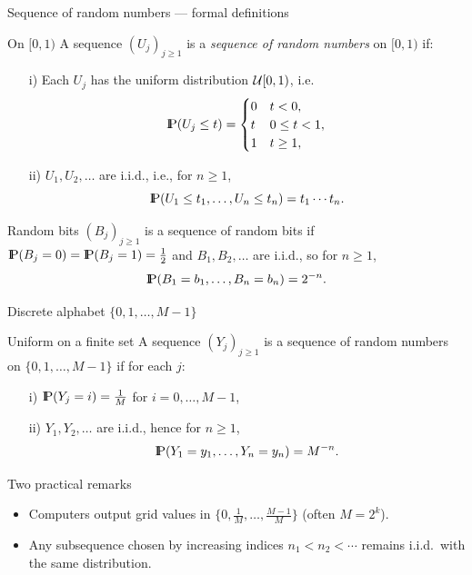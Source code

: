 \documentclass[aspectratio=169]{beamer}
\newcommand{\Prob}{{\rm I\hspace{-0.8mm}P}}
\begin{document}
\begin{frame}{Sequence of random numbers — formal definitions}
\begin{block}{On $[0,1)$}
A sequence $(U_j)_{j\ge 1}$ is a \textsl{sequence of random numbers} on $[0,1)$ if:
\begin{enumerate}
  \item[i)] Each $U_j$ has the uniform distribution ${\cal U}[0,1)$, i.e.
  \[
    \Prob(U_j \le t) =
    \begin{cases}
      0 & t<0,\\
      t & 0\le t<1,\\
      1 & t\ge 1,
    \end{cases}
  \]
  \item[ii)] $U_1,U_2,\ldots$ are i.i.d., i.e., for $n\ge 1$,
  \[
    \Prob(U_1\le t_1,\ldots,U_n\le t_n)=t_1\cdots t_n .
  \]
\end{enumerate}
\end{block}

\smallskip
\begin{block}{Random bits}
$(B_j)_{j\ge 1}$ is a sequence of random bits if
$\Prob(B_j=0)=\Prob(B_j=1)=\tfrac12$ and $B_1,B_2,\ldots$ are i.i.d., so for $n\ge 1$,
\[
  \Prob(B_1=b_1,\ldots,B_n=b_n)=2^{-n}.
\]
\end{block}
\end{frame}

\begin{frame}{Discrete alphabet $\{0,1,\ldots,M-1\}$}
\begin{block}{Uniform on a finite set}
A sequence $(Y_j)_{j\ge 1}$ is a sequence of random numbers on
$\{0,1,\ldots,M-1\}$ if for each $j$:
\begin{enumerate}
  \item[i)] $\Prob(Y_j=i)=\tfrac1M$ for $i=0,\ldots,M-1$,
  \item[ii)] $Y_1,Y_2,\ldots$ are i.i.d., hence for $n\ge 1$,
  \[
    \Prob(Y_1=y_1,\ldots,Y_n=y_n)=M^{-n}.
  \]
\end{enumerate}
\end{block}

\smallskip
\begin{block}{Two practical remarks}
\begin{itemize}
  \item Computers output grid values in $\{0,\tfrac1M,\ldots,\tfrac{M-1}{M}\}$ (often $M=2^k$).
  \item Any subsequence chosen by increasing indices $n_1<n_2<\cdots$ remains i.i.d.\ with the same distribution.
\end{itemize}
\end{block}
\end{frame}
\end{document}

